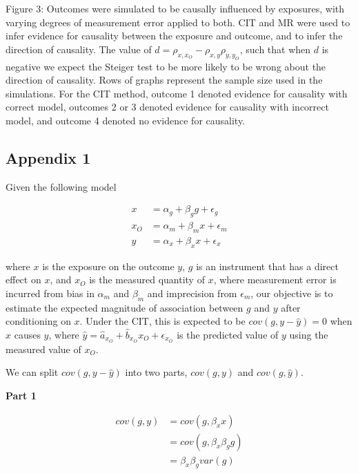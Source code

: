 \documentclass[]{article}
\begin{document}
Figure 3: Outcomes were simulated to be causally influenced by
exposures, with varying degrees of measurement error applied to both.
CIT and MR were used to infer evidence for causality between the
exposure and outcome, and to infer the direction of causality. The value
of \(d = \rho_{x, x_O} - \rho_{x,y}\rho_{y,y_O}\), such that when \(d\)
is negative we expect the Steiger test to be more likely to be wrong
about the direction of causality. Rows of graphs represent the sample
size used in the simulations. For the CIT method, outcome 1 denoted
evidence for causality with correct model, outcomes 2 or 3 denoted
evidence for causality with incorrect model, and outcome 4 denoted no
evidence for causality.

\newpage

\subsection{Appendix 1}\label{appendix-1}

Given the following model

\[
\begin{aligned}
x & = \alpha_g + \beta_g g + \epsilon_g \\
x_O & = \alpha_m + \beta_m x + \epsilon_m \\
y & = \alpha_x + \beta_x x + \epsilon_x
\end{aligned}
\]

where \(x\) is the exposure on the outcome \(y\), \(g\) is an instrument
that has a direct effect on \(x\), and \(x_O\) is the measured quantity
of \(x\), where measurement error is incurred from bias in \(\alpha_m\)
and \(\beta_m\) and imprecision from \(\epsilon_m\), our objective is to
estimate the expected magnitude of association between \(g\) and \(y\)
after conditioning on \(x\). Under the CIT, this is expected to be
\(cov(g, y - \hat{y}) = 0\) when \(x\) causes \(y\), where
\(\hat{y} = \hat{a}_{x_O} + \hat{b}_{x_O} x_O + \epsilon_{x_O}\) is the
predicted value of \(y\) using the measured value of \(x_O\).

We can split \(cov(g, y - \hat{y})\) into two parts, \(cov(g, y)\) and
\(cov(g, \hat{y})\).

\textbf{Part 1}

\[
\begin{aligned}
cov(g, y) & = cov(g, \beta_x x) \\
          & = cov(g, \beta_x \beta_g g) \\
          & = \beta_x\beta_g var(g)
\end{aligned}
\]
\end{document}
